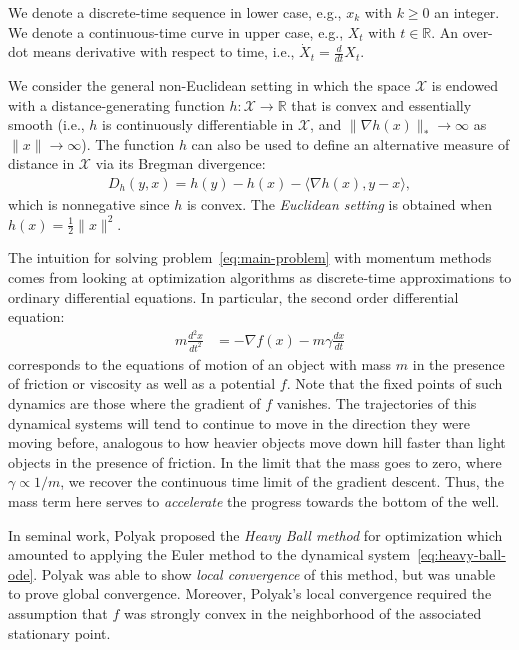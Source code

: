 \documentclass[11pt]{article}
\theoremstyle{plain}
\newcommand{\R}{{\mathbb R}}
\newcommand{\X}{{\mathcal X}}
\begin{document}
We denote a discrete-time sequence in lower case, e.g., $x_k$ with $k \ge 0$ an integer. We denote a continuous-time curve in upper case, e.g., $X_t$ with $t \in \R$. An over-dot means derivative with respect to time, i.e., $\dot X_t = \frac{d}{dt} X_t$.

We consider the general non-Euclidean setting in which the space $\X$ is endowed with a distance-generating function $h \colon \X \to \R$ that is convex and essentially smooth (i.e., $h$ is continuously differentiable in $\X$, and $\|\nabla h(x)\|_* \to \infty$ as $\|x\| \to \infty$). The function $h$ can also be used to define an alternative measure of distance in $\X$ via its Bregman divergence:
\begin{align*}
D_h(y,x) = h(y) - h(x) - \langle \nabla h(x), y-x \rangle,
\end{align*}
which is nonnegative since $h$ is convex. 
The \emph{Euclidean setting} is obtained when $h(x) = \frac{1}{2} \|x\|^2$.

The intuition for solving problem~\eqref{eq:main-problem} with momentum methods comes from looking at optimization algorithms as discrete-time approximations to ordinary differential equations. In particular, the second order differential equation:
 \begin{align}\label{eq:heavy-ball-ode}
 m \frac{d^2x}{dt^2}& = - \nabla f(x) - m \gamma \frac{dx}{dt}
 \end{align}
corresponds to the equations of motion of an object with mass $m$ in the presence of  friction or viscosity as well as a potential $f$.  Note that the fixed points of such dynamics are those where the gradient of $f$ vanishes.   The trajectories of this dynamical systems will tend to continue to move in the direction they were moving before, analogous to how heavier objects move down hill faster than light objects in the presence of friction.  In the limit that the mass goes to zero, where $\gamma \propto 1/m$, we recover the continuous time limit of the gradient descent.  Thus, the mass term here serves to \emph{accelerate} the progress towards the bottom of the well. 

In seminal work, Polyak proposed the \emph{Heavy Ball method} for optimization which amounted to applying the Euler method to the dynamical system~\eqref{eq:heavy-ball-ode}.  Polyak was able to show \emph{local convergence} of this method, but was unable to prove global convergence.  Moreover, Polyak's local convergence required the assumption that $f$ was strongly convex in the neighborhood of the associated stationary point.
\end{document}
